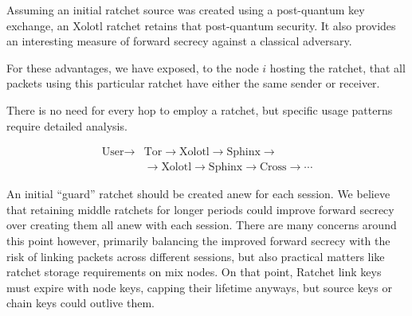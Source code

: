 \documentclass[twoside,letterpaper]{sig-alternate}
\begin{document}
\begin{figure}[b!]%
\end{figure}

\smallskip

Assuming an initial ratchet source was created using a post-quantum
key exchange, an Xolotl ratchet retains that post-quantum security.
It also provides an interesting measure of forward secrecy against
a classical adversary. 

For these advantages, we have exposed,
 to the node $i$ hosting the ratchet, that all packets using this
particular ratchet have either the same sender or receiver.

There is no need for every hop to employ a ratchet, %
but specific usage patterns require detailed analysis. 

\[ \begin{aligned}
\textrm{User} \to &\textrm{Tor} \to \textrm{Xolotl} \to \textrm{Sphinx} \to \\
\quad &\to \textrm{Xolotl} \to \textrm{Sphinx} \to \textrm{Cross} \to \cdots 
\end{aligned} \]

An initial ``guard'' ratchet should be created anew for each session.
We believe that retaining middle ratchets for longer periods could
improve forward secrecy over creating them all anew with each session. 
There are many concerns around this point however, primarily balancing
the improved forward secrecy with the risk of linking packets across
different sessions, but
 also practical matters like ratchet storage requirements on mix nodes.  
On that point, Ratchet link keys must expire with node keys,
 capping their lifetime anyways,
but source keys or chain keys could outlive them.
\end{document}
